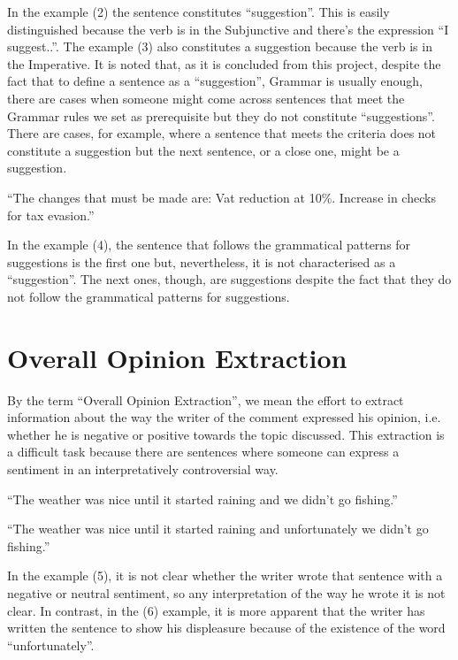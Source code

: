 In the example (2) the sentence constitutes  ``suggestion''. This is easily distinguished because the verb is in the Subjunctive and there's the expression ``I suggest..''. The example (3) also constitutes a suggestion because the verb is in the Imperative. It is noted that, as it is concluded from this project, despite the fact that to define a sentence as a ``suggestion'', Grammar is usually enough, there are cases when someone might come across sentences that meet the Grammar rules we set as prerequisite but they do not constitute  ``suggestions''. There are cases, for example, where a sentence that meets the criteria does not constitute a suggestion but the next sentence, or a close one, might be a suggestion.\\
\begin{example}
	``The changes that must be made are: Vat reduction at 10\%. Increase in checks for tax evasion.''\\
\end{example}
In the example (4), the sentence that follows the grammatical patterns for suggestions is the first one but, nevertheless, it is not characterised as a ``suggestion''. The next ones, though, are suggestions despite the fact that they do not follow the grammatical patterns for suggestions.

\section{Overall Opinion Extraction}
By the term  ``Overall Opinion Extraction'', we mean the effort to extract information about the way the writer of the comment expressed  his opinion, i.e. whether he is negative or positive towards the topic discussed. This extraction is a difficult task because there are sentences where someone can express a sentiment in an interpretatively controversial way.\\
\begin{example}
	``The weather was nice until it started raining and we didn't go fishing.''\\
\end{example}
\begin{example}
	``The weather was nice until it started raining and unfortunately we didn't go fishing.''\\
\end{example}
In the example (5), it is not clear whether the writer wrote that sentence with a negative or neutral sentiment, so any interpretation of the way he wrote it is not clear. In contrast, in the (6) example, it is more apparent that the writer has written the sentence to show his displeasure because of the existence of the word ``unfortunately''.

